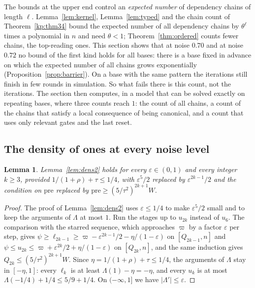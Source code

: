 \documentclass[11pt]{amsart}
\newtheorem{lemma}[theorem]{Lemma}
\theoremstyle{definition}
\theoremstyle{remark}
\newcommand{\eps}{\varepsilon}
\begin{document}
The bounds at the upper end control an \emph{expected number} of dependency chains of length
$\ell$. Lemma~\ref{lem:kernel}, Lemma~\ref{lem:typed} and the chain count of Theorem~\ref{kp:thm34}
bound the expected number of all dependency chains by $\theta^\ell$ times a polynomial in $n$ and
need $\theta<1$; Theorem~\ref{thm:ordered} counts fewer chains, the top-reading ones. This section
shows that at noise $0.70$ and at noise $0.72$ no bound of the first kind holds for all bases:
there is a base fixed in advance on which the expected number of all chains grows exponentially
(Proposition~\ref{prop:barrier}). On a base with the same pattern the iterations still finish in
few rounds in simulation. So what fails there is this count, not the iterations. The section then
computes, in a model that can be solved exactly on repeating bases, where three counts reach $1$:
the count of all chains, a count of the chains that satisfy a local consequence of being canonical,
and a count that uses only relevant gates and the last reset.

\subsection{The density of ones at every noise level}

\begin{lemma}\label{lem:dens2any}
Lemma~\ref{lem:dens2} holds for every $\eps\in(0,1)$ and every integer $k\ge3$, provided
$1/(1+\rho)+\tau\le1/4$, with $\eps^5/2$ replaced by $\eps^{2k-1}/2$ and the condition on
$\mathrm{pre}$ replaced by $\mathrm{pre}\ge(5/\tau^2)^{2k+1}W$.
\end{lemma}

\begin{proof}
The proof of Lemma~\ref{lem:dens2} uses $\eps\le1/4$ to make $\eps^5/2$ small and to keep the
arguments of $\Lambda$ at most $1$. Run the stages up to $u_{2k}$ instead of $u_6$. The comparison with the starred sequence, which approaches
$\varpi$ by a factor $\eps$ per step, gives $\psi\ge\ell_{2k-1}\ge\varpi-\eps^{2k-1}/2-\eta/(1-\eps)$
on $[Q_{2k-1},n]$ and $\psi\le u_{2k}\le\varpi+\eps^{2k}/2+\eta/(1-\eps)$ on $[Q_{2k},n]$, and the
same induction gives $Q_{2k}\le(5/\tau^2)^{2k+1}W$. Since $\eta=1/(1+\rho)+\tau\le1/4$, the
arguments of $\Lambda$ stay in $[-\eta,1]$: every $\ell_k$ is at least $\Lambda(1)-\eta=-\eta$, and
every $u_k$ is at most $\Lambda(-1/4)+1/4\le5/9+1/4$. On $(-\infty,1]$ we have $|\Lambda'|\le\eps$.
\end{proof}
\end{document}
